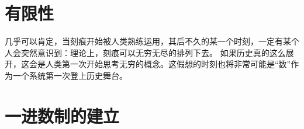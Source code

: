 \section{有限性}

几乎可以肯定，当刻痕开始被人类熟练运用，其后不久的某一个时刻，一定有某个人会突然意识到：理论上，刻痕可以无穷无尽的排列下去。
如果历史真的这么展开，这会是人类第一次开始思考无穷的概念。这假想的时刻也将非常可能是“数”作为一个系统第一次登上历史舞台。

\section{一进数制的建立}
